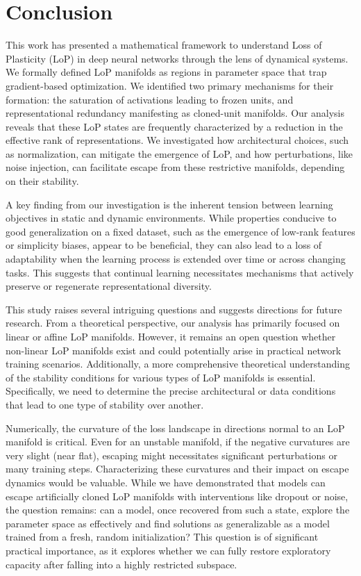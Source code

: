 \documentclass{article}
\numberwithin{figure}{section}
\begin{document}
\section{Conclusion}
\label{sec:discussion}
This work has presented a mathematical framework to understand Loss of Plasticity (LoP) in deep neural networks through the lens of dynamical systems. We formally defined LoP manifolds as regions in parameter space that trap gradient-based optimization. We identified two primary mechanisms for their formation: the saturation of activations leading to frozen units, and representational redundancy manifesting as cloned-unit manifolds.  Our analysis reveals that these LoP states are frequently characterized by a reduction in the effective rank of representations. We investigated how architectural choices, such as normalization, can mitigate the emergence of LoP, and how perturbations, like noise injection, can facilitate escape from these restrictive manifolds, depending on their stability.

A key finding from our investigation is the inherent tension between learning objectives in static and dynamic environments. While properties conducive to good generalization on a fixed dataset, such as the emergence of low-rank features or simplicity biases, appear to be beneficial, they can also lead to a loss of adaptability when the learning process is extended over time or across changing tasks. This suggests that continual learning necessitates mechanisms that actively preserve or regenerate representational diversity.

This study raises several intriguing questions and suggests directions for future research.
From a theoretical perspective, our analysis has primarily focused on linear or affine LoP manifolds. However, it remains an open question whether non-linear LoP manifolds exist and could potentially arise in practical network training scenarios. Additionally, a more comprehensive theoretical understanding of the stability conditions for various types of LoP manifolds is essential. Specifically, we need to determine the precise architectural or data conditions that lead to one type of stability over another.  

Numerically, the curvature of the loss landscape in directions normal to an LoP manifold is critical. Even for an unstable manifold, if the negative curvatures are very slight (near flat), escaping might  necessitates significant perturbations or many training steps. Characterizing these curvatures and their impact on escape dynamics would be valuable.
While we have demonstrated that models can escape artificially cloned LoP manifolds with interventions like dropout or noise, the question remains: can a model, once recovered from such a state, explore the parameter space as effectively and find solutions as generalizable as a model trained from a fresh, random initialization? This question is of significant practical importance, as it explores whether we can fully restore exploratory capacity after falling into a highly restricted subspace.
\end{document}
